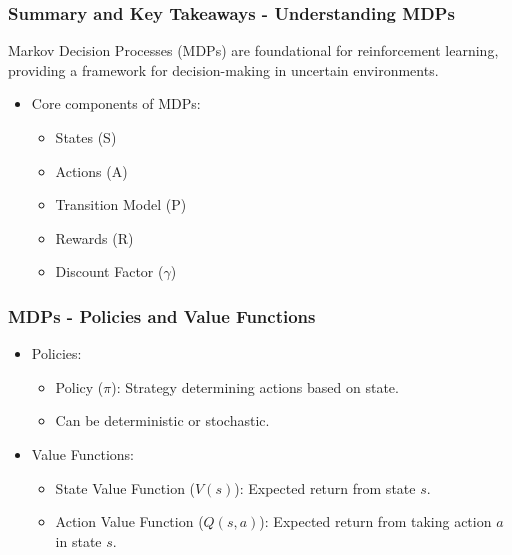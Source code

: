 \documentclass[aspectratio=169]{beamer}
\begin{document}
\begin{frame}[fragile]
  \frametitle{Summary and Key Takeaways - Understanding MDPs}
  Markov Decision Processes (MDPs) are foundational for reinforcement learning, providing a framework for decision-making in uncertain environments.

  \begin{itemize}
      \item Core components of MDPs:
      \begin{itemize}
          \item States (S)
          \item Actions (A)
          \item Transition Model (P)
          \item Rewards (R)
          \item Discount Factor ($\gamma$)
      \end{itemize}
  \end{itemize}
\end{frame}

\begin{frame}[fragile]
  \frametitle{MDPs - Policies and Value Functions}
  
  \begin{itemize}
      \item Policies:
      \begin{itemize}
          \item Policy ($\pi$): Strategy determining actions based on state.
          \item Can be deterministic or stochastic.
      \end{itemize}
      
      \item Value Functions:
      \begin{itemize}
          \item State Value Function ($V(s)$): Expected return from state $s$.
          \item Action Value Function ($Q(s,a)$): Expected return from taking action $a$ in state $s$.
      \end{itemize}
  \end{itemize}
\end{frame}
\end{document}

